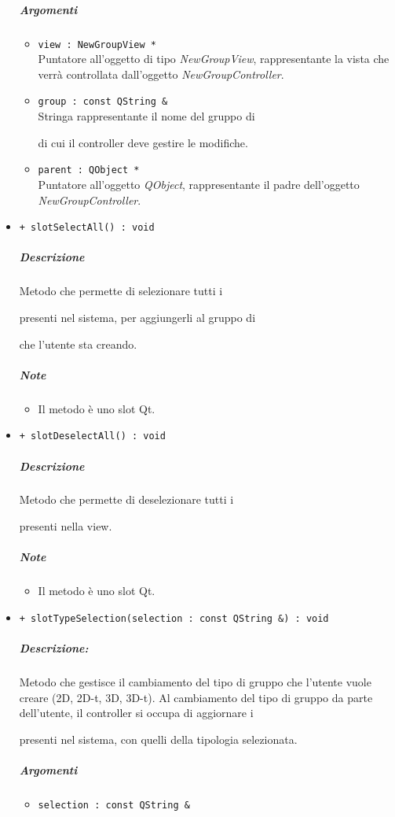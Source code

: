 \begin{itemize}
			\subparagraph{Argomenti}
			\begin{itemize}
				\item \color{RoyalPurple} \verb!view : NewGroupView *!\\				
\color{black} Puntatore all'oggetto di tipo \textsl{NewGroupView}, rappresentante la vista che verrà controllata dall'oggetto \textsl{NewGroupController}.
				\item \color{RoyalPurple} \verb!group : const QString &!\\				
\color{black} Stringa rappresentante il nome del gruppo di \subject{} di cui il controller deve gestire le modifiche.
				\item \color{RoyalPurple} \verb!parent : QObject *!\\				
\color{black} Puntatore all'oggetto \textsl{QObject}, rappresentante il padre dell'oggetto \textsl{NewGroupController}.
			\end{itemize}
			\item \color{blue} \verb!+ slotSelectAll() : void!
			\color{black}
			\subparagraph{Descrizione} Metodo che permette di selezionare tutti i \subject{} presenti nel sistema, per aggiungerli al gruppo di \subject{} che l'utente sta creando.
			\subparagraph{Note}
			\begin{itemize}
				\item Il metodo è uno slot\g{} Qt\g{}.
			\end{itemize}
			\item \color{blue} \verb!+ slotDeselectAll() : void!
			\color{black}
			\subparagraph{Descrizione} Metodo che permette di deselezionare tutti i \subject{} presenti nella view.
			\subparagraph{Note}
			\begin{itemize}
				\item Il metodo è uno slot\g{} Qt\g{}.
			\end{itemize}
			\item \color{blue} \verb!+ slotTypeSelection(selection : const QString &) : void!
			\color{black}
			\subparagraph{Descrizione:} Metodo che gestisce il cambiamento del tipo di gruppo che l'utente vuole creare (2D, 2D-t, 3D, 3D-t). Al cambiamento del tipo di gruppo da parte dell'utente, il controller si occupa di aggiornare i \subject{} presenti nel sistema, con quelli della tipologia selezionata.
			\color{black}
			\subparagraph{Argomenti}
			\begin{itemize}
				\item \color{RoyalPurple} \verb!selection : const QString &!\\				

\end{itemize}
\end{itemize}
